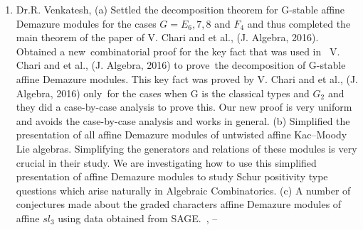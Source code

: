 \begin{enumerate}
\item Dr.R. Venkatesh, (a) Settled the decomposition theorem for G-stable affine Demazure modules for the cases $G = E_6,7,8$ and $F_4$ and thus completed the main theorem of the paper of V. Chari and et al., (J. Algebra, 2016). Obtained a new combinatorial proof for the key fact that was used in  V. Chari and et al., (J. Algebra, 2016) to prove the decomposition of G-stable affine Demazure modules. This key fact was proved by V. Chari and et al., (J. Algebra, 2016) only for the cases when G is the classical types and $G_2$ and they did a case-by-case analysis to prove this. Our new proof is very uniform and avoids the case-by-case analysis and works in general.  (b) Simplified the presentation of all affine Demazure modules of untwisted affine Kac–Moody Lie algebras. Simplifying the generators and relations of these modules is very crucial in their study. We are investigating how to use this simplified presentation of affine Demazure modules to study Schur positivity type questions which arise naturally in Algebraic Combinatorics.   (c) A number of conjectures made about the graded characters affine Demazure modules of affine $sl_3$ using data obtained from SAGE. , --

\end{enumerate}
